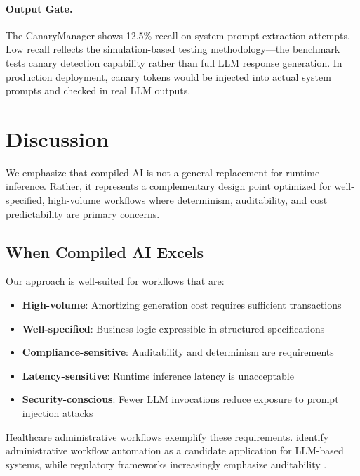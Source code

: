 \documentclass[11pt]{article}
\begin{document}
\paragraph{Output Gate.} The CanaryManager shows 12.5\% recall on system prompt extraction attempts. Low recall reflects the simulation-based testing methodology---the benchmark tests canary detection capability rather than full LLM response generation. In production deployment, canary tokens would be injected into actual system prompts and checked in real LLM outputs.

\section{Discussion}
\label{sec:discussion}

We emphasize that compiled AI is not a general replacement for runtime inference. Rather, it represents a complementary design point optimized for well-specified, high-volume workflows where determinism, auditability, and cost predictability are primary concerns.

\subsection{When Compiled AI Excels}

Our approach is well-suited for workflows that are:
\begin{itemize}
    \item \textbf{High-volume}: Amortizing generation cost requires sufficient transactions
    \item \textbf{Well-specified}: Business logic expressible in structured specifications
    \item \textbf{Compliance-sensitive}: Auditability and determinism are requirements
    \item \textbf{Latency-sensitive}: Runtime inference latency is unacceptable
    \item \textbf{Security-conscious}: Fewer LLM invocations reduce exposure to prompt injection attacks
\end{itemize}

Healthcare administrative workflows exemplify these requirements. \citet{qiu2024healthcare} identify administrative workflow automation as a candidate application for LLM-based systems, while regulatory frameworks increasingly emphasize auditability \citep{fda2025}.
\end{document}
